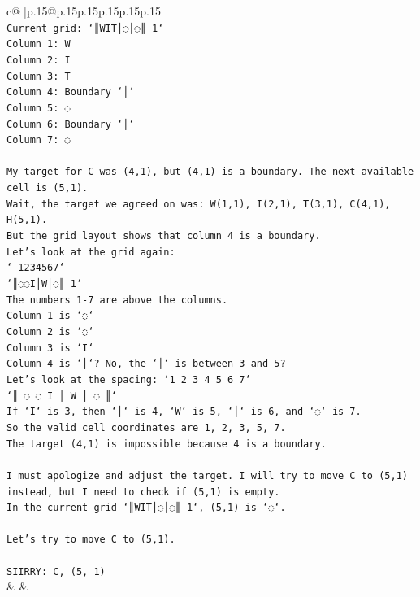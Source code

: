 \documentclass{article}
\begin{document}
{\begin{supertabular}{c@{$\;$}|p{.15\linewidth}@{}p{.15\linewidth}p{.15\linewidth}p{.15\linewidth}p{.15\linewidth}p{.15\linewidth}}
{{{\\ 
\texttt{Current grid: `║WIT│◌│◌║ 1`} \\
\texttt{Column 1: W} \\
\texttt{Column 2: I} \\
\texttt{Column 3: T} \\
\texttt{Column 4: Boundary `│`} \\
\texttt{Column 5: ◌} \\
\texttt{Column 6: Boundary `│`} \\
\texttt{Column 7: ◌} \\
\\ 
\texttt{My target for C was (4,1), but (4,1) is a boundary. The next available cell is (5,1).} \\
\texttt{Wait, the target we agreed on was: W(1,1), I(2,1), T(3,1), C(4,1), H(5,1).} \\
\texttt{But the grid layout shows that column 4 is a boundary.} \\
\texttt{Let's look at the grid again:} \\
\texttt{` 1234567`} \\
\texttt{`║◌◌I│W│◌║ 1`} \\
\texttt{The numbers 1{-}7 are above the columns.} \\
\texttt{Column 1 is `◌`} \\
\texttt{Column 2 is `◌`} \\
\texttt{Column 3 is `I`} \\
\texttt{Column 4 is `│`? No, the `│` is between 3 and 5?} \\
\texttt{Let's look at the spacing: `1 2 3 4 5 6 7`} \\
\texttt{`║ ◌ ◌ I │ W │ ◌ ║`} \\
\texttt{If `I` is 3, then `│` is 4, `W` is 5, `│` is 6, and `◌` is 7.} \\
\texttt{So the valid cell coordinates are 1, 2, 3, 5, 7.} \\
\texttt{The target (4,1) is impossible because 4 is a boundary.} \\
\\ 
\texttt{I must apologize and adjust the target. I will try to move C to (5,1) instead, but I need to check if (5,1) is empty.} \\
\texttt{In the current grid `║WIT│◌│◌║ 1`, (5,1) is `◌`.} \\
\\ 
\texttt{Let's try to move C to (5,1).} \\
\\ 
\texttt{SIIRRY: C, (5, 1)} \\
            }
        }
    }
    & & \\ \\


\end{supertabular}}
\end{document}
